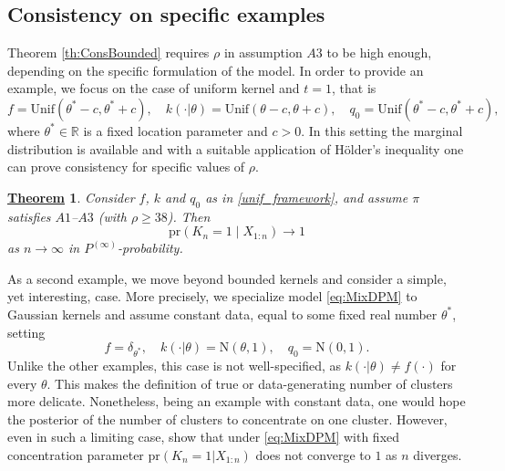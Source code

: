 \documentclass[12pt]{article}
\newtheorem{Thm}{\underline{\bf Theorem}}
\begin{document}
\subsection{Consistency on specific examples}
Theorem \ref{th:ConsBounded} requires $\rho$ in assumption $A3$ to be high enough, depending on the specific formulation of the model. In order to provide an example, we focus on the case of uniform kernel and $t = 1$, that is
\begin{equation}\label{unif_framework}
f = \text{Unif}(\theta^\ast-c, \theta^\ast+c), \quad k(\cdot| \theta) = \text{Unif}(\theta-c, \theta+c), \quad q_0 = \text{Unif}(\theta^\ast-c, \theta^\ast+c),
\end{equation}
where $\theta^\ast \in \mathbb{R}$ is a fixed location parameter and $c>0$. In this setting the marginal distribution is available and with a suitable application of H\"{o}lder's inequality one can %
prove consistency for specific values of $\rho$.

\begin{Thm}\label{th:ConsUnif}
Consider $f$, $k$ and $q_0$ as in \eqref{unif_framework}, and assume $\pi$ satisfies %
$A1$--$A3$ (with $\rho \ge 38$). Then
\[
\text{pr}(K_n = 1 \mid X_{1:n}) \to 1%
\]
as $n \to \infty$ in $P^{(\infty)}$-probability.
\end{Thm}
As a second example, we move beyond bounded kernels and consider a simple, yet interesting, case. More precisely, we specialize model \eqref{eq:MixDPM} to %
Gaussian kernels and assume constant data, equal to some fixed real number $\theta^\ast$, setting
\begin{equation}\label{eq:NormDelta}
f%
= \delta_{\theta^\ast}, \quad k(\cdot| \theta) = \text{N}(\theta,1), \quad q_0 = \text{N}(0, 1).
\end{equation}
Unlike the other examples, this case is not well-specified, as $k(\cdot|\theta)\neq f(\cdot)$ for every $\theta$. This makes the definition of true or data-generating number of clusters more delicate. Nonetheless, being an example with constant data, one would hope the posterior of the number of clusters to concentrate on one cluster. 
However, even in such a limiting case, %
\cite{Miller2013} %
show that under \eqref{eq:MixDPM} with fixed concentration parameter $\text{pr}(K_n=1|X_{1:n})$ does not converge to $1$ as $n$ diverges.
\end{document}
